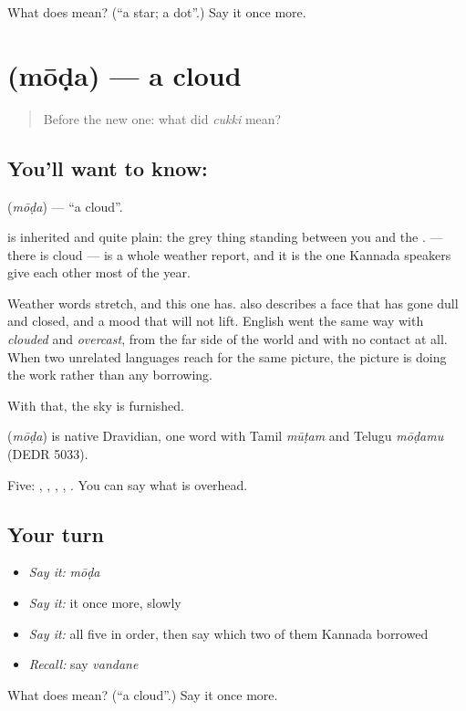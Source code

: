\begin{tcolorbox}[breakable,colback=teal!4,colframe=teal!35!black,title={Before you move on}]
What does  mean? (\textquotedblleft{}a star; a dot\textquotedblright{}.) Say it once more.
\end{tcolorbox}
\section[\texorpdfstring{\kn{ಮೋಡ} (mōḍa)}{ಮೋಡ (mōḍa)}]{ (mōḍa) — a cloud}

\label{lesson:KA-C53-cloud}



\begin{quote}
Before the new one: what did \emph{cukki} mean?
\end{quote}

\subsection*{You'll want to know: }
\textbf{} (\emph{mōḍa}) — \textquotedblleft{}a cloud\textquotedblright{}.

 is inherited and quite plain: the grey thing standing between you and the .   — there is cloud — is a whole weather report, and it is the one Kannada speakers give each other most of the year.

Weather words stretch, and this one has.  also describes a face that has gone dull and closed, and a mood that will not lift. English went the same way with \emph{clouded} and \emph{overcast}, from the far side of the world and with no contact at all. When two unrelated languages reach for the same picture, the picture is doing the work rather than any borrowing.

With that, the sky is furnished.

\begin{cousinweb}
\textbf{} (\emph{mōḍa}) is native Dravidian, one word with Tamil \emph{mūṭam} and Telugu \emph{mōḍamu} (DEDR 5033).
\end{cousinweb}

\begin{grammarlens}[title={What you've built}]
Five: , , , , . You can say what is overhead.
\end{grammarlens}

\subsection*{Your turn}
\begin{itemize}
\raggedright
  \item \emph{Say it:} \emph{mōḍa}
  \item \emph{Say it:} it once more, slowly
  \item \emph{Say it:} all five in order, then say which two of them Kannada borrowed
  \item \emph{Recall:} say \emph{vandane}
\end{itemize}

\begin{tcolorbox}[breakable,colback=teal!4,colframe=teal!35!black,title={Before you move on}]
What does  mean? (\textquotedblleft{}a cloud\textquotedblright{}.) Say it once more.
\end{tcolorbox}
